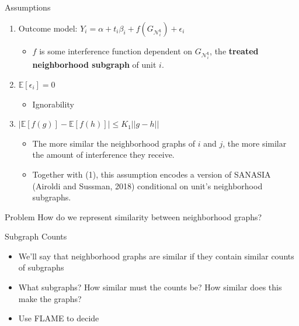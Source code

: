 \documentclass[newPxFont,numfooter,sectionpages]{beamer}
\newcommand{\E}{\mathbb{E}}
\newcommand{\bt}{\mathbf{t}}
\newcommand{\Gni}{G_{\mathcal{N}_i^\bt}}
\begin{document}
\begin{frame}{Assumptions}
\begin{enumerate}
  \item Outcome model: $Y_i = \alpha + t_i\beta_i + f(\Gni) + \epsilon_i$
  \begin{itemize}
    \item $f$ is some interference function dependent on $\Gni$, the \textbf{treated neighborhood subgraph} of unit $i$.
  \end{itemize}
  \item $\E[\epsilon_i] = 0$
    \begin{itemize}
    \item Ignorability
  \end{itemize}
  \item $|\E[f(g)] - \E[f(h)]| \leq K_1||g - h||$
  \begin{itemize}
    \item The more similar the neighborhood graphs of $i$ and $j$, the more similar the amount of interference they receive.
    \item Together with (1), this assumption encodes a version of SANASIA (Airoldi and Sussman, 2018) conditional on unit's neighborhood subgraphs.
  \end{itemize}
\end{enumerate}
\begin{alertblock}{Problem}
How do we represent similarity between neighborhood graphs?
\end{alertblock}
\end{frame}
\begin{frame}{Subgraph Counts}
	\begin{itemize}
		\item We'll say that neighborhood graphs are similar if they contain similar counts of subgraphs 
		\item What subgraphs? How similar must the counts be? How similar does this make the graphs?
		\item Use FLAME to decide
	\end{itemize}
\end{frame}
\end{document}
